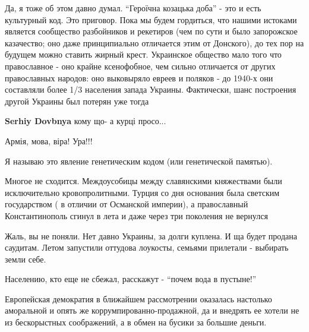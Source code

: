  
 
 
 
 
\zzSecCmt

\begin{itemize} %

Да, я тоже об этом давно думал. \enquote{Героїчна козацька доба} - это и есть
культурный код. Это приговор. Пока мы будем гордиться, что нашими истоками
является сообщество разбойников и рекетиров (чем по сути и было запорожское
казачество; оно даже принципиально отличается этим от Донского), до тех пор на
будущем можно ставить жирный крест. Украинское общество мало того что
православное - оно крайне ксенофобное, чем сильно отличается от других
православных народов: оно выковыряло евреев и поляков - до 1940-х они
составляли более 1/3 населения запада Украины. Фактически, шанс построения другой
Украины был потерян уже тогда

\begin{itemize} %
\textbf{Serhiy Dovbnya} кому що- а курці просо...

Армія, мова, віра! Ура!!!
\end{itemize} %

Я называю это явление генетическим кодом (или генетической памятью).


Многое не сходится. Междоусобицы между славянскими княжествами были
исключительно кровопролитными. Турция со дня основания была светским
государством ( в отличии от Османской империи), а православный Константинополь
сгинул в лета и даже через три поколения не вернулся



Жаль, вы не поняли. Нет давно Украины, за долги куплена. И ща будет продана
саудитам. Летом запустили оттудова лоукосты, семьями прилетали - выбирать земли
себе.

Населению, кто еще не сбежал, расскажут - \enquote{почем вода в пустыне!}


Европейская демократия в ближайшем рассмотрении оказалась настолько аморальной
и опять же коррумпированно-продажной, да и внедрять ее хотели не из
бескорыстных соображений, а в обмен на бусики за большие деньги.



\end{itemize}
